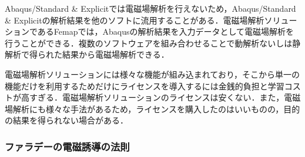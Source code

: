 Abaqus/Standard & Explicitでは電磁場解析を行えないため，Abaqus/Standard & Explicitの解析結果を他のソフトに流用することがある．電磁場解析ソリューションであるFemapでは，Abaqusの解析結果を入力データとして電磁場解析を行うことができる．複数のソフトウェアを組み合わせることで動解析ないしは静解析で得られた結果から電磁場解析できる．

電磁場解析ソリューションには様々な機能が組み込まれており，そこから単一の機能だけを利用するためだけにライセンスを導入するには金銭的負担と学習コストが高すぎる．電磁場解析ソリューションのライセンスは安くない．また，電磁場解析にも様々な手法があるため，ライセンスを購入したのはいいものの，目的の結果を得られない場合がある．



\subsubsection{ファラデーの電磁誘導の法則}
